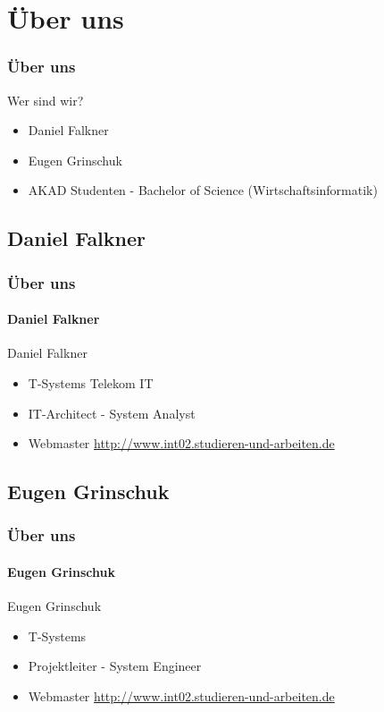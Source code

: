 \documentclass[xcolor=dvipsnames]{beamer}
\subtitle{Modul INT02} %
\institute{AKAD Pinneberg + Stuttgart} %
\title{\Title}
\author{\Author}
\date{\today}
\begin{document}
\begin{frame}
    \titlepage
\end{frame}


\frame{\tableofcontents[hideothersubsections]} 


\section{Über uns}
\begin{frame} %
  \frametitle{Über uns} %
  \begin{block}{Wer sind wir?}
	  \begin{itemize}
  		\item Daniel Falkner
	  	\item Eugen Grinschuk
	  	\item AKAD Studenten - Bachelor of Science (Wirtschaftsinformatik)
	  \end{itemize}
  \end{block}
\end{frame}

\subsection{Daniel Falkner}
\begin{frame} %
  \frametitle{Über uns} %
  \framesubtitle{Daniel Falkner} %
  \begin{block}{Daniel Falkner}
	  \begin{itemize}
  		\item T-Systems Telekom IT
  		\item IT-Architect - System Analyst
 		\item Webmaster \url{http://www.int02.studieren-und-arbeiten.de}
	  \end{itemize}
  \end{block}
\end{frame}

\subsection{Eugen Grinschuk}
\begin{frame} %
  \frametitle{Über uns} %
  \framesubtitle{Eugen Grinschuk} %
  \begin{block}{Eugen Grinschuk}
	  \begin{itemize}
  		\item T-Systems
  		\item Projektleiter - System Engineer
  		\item Webmaster \url{http://www.int02.studieren-und-arbeiten.de}
	  \end{itemize}
  \end{block}
\end{frame}
\end{document}
